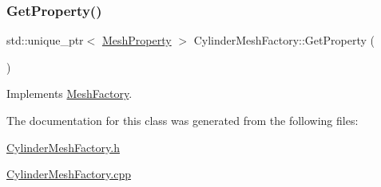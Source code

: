 \mbox{\label{class_cylinder_mesh_factory_a3fa17fc0e14db4007c9c2a6cdeb1d8fa}} 
\subsubsection{\texorpdfstring{GetProperty()}{GetProperty()}}
{\footnotesize\ttfamily std\+::unique\+\_\+ptr$<$ \mbox{\hyperlink{class_mesh_property}{Mesh\+Property}} $>$ Cylinder\+Mesh\+Factory\+::\+Get\+Property (\begin{DoxyParamCaption}{ }\end{DoxyParamCaption})\hspace{0.3cm}{\ttfamily [virtual]}}



Implements \mbox{\hyperlink{class_mesh_factory_abff50d215458843dd98271ab803a7671}{Mesh\+Factory}}.



The documentation for this class was generated from the following files\+:\begin{DoxyCompactItemize}
\item 
\mbox{\hyperlink{_cylinder_mesh_factory_8h}{Cylinder\+Mesh\+Factory.\+h}}\item 
\mbox{\hyperlink{_cylinder_mesh_factory_8cpp}{Cylinder\+Mesh\+Factory.\+cpp}}\end{DoxyCompactItemize}
